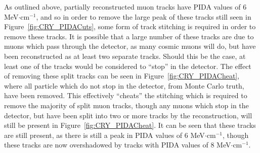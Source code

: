 As outlined above, partially reconstructed muon tracks have PIDA values of 6 MeV$\cdot$cm$^{-1}$, and so in order to remove the large peak of these tracks still seen in Figure~\ref{fig:CRY_PIDACuts}, some form of track stitching is required in order to remove these tracks. It is possible that a large number of these tracks are due to muons which pass through the detector, as many cosmic muons will do, but have been reconstructed as at least two separate tracks. Should this be the case, at least one of the tracks would be considered to ``stop'' in the detector. The effect of removing these split tracks can be seen in Figure~\ref{fig:CRY_PIDACheat}, where all particle which do not stop in the detector, from Monte Carlo truth, have been removed. This effectively ``cheats'' the stitching which is required to remove the majority of split muon tracks, though any muons which stop in the detector, but have been split into two or more tracks by the reconstruction, will still be present in Figure~\ref{fig:CRY_PIDACheat}. It can be seen that these tracks are still present, as there is still a peak in PIDA values of 6 MeV$\cdot$cm$^{-1}$, though these tracks are now overshadowed by tracks with PIDA values of 8 MeV$\cdot$cm$^{-1}$. \\

